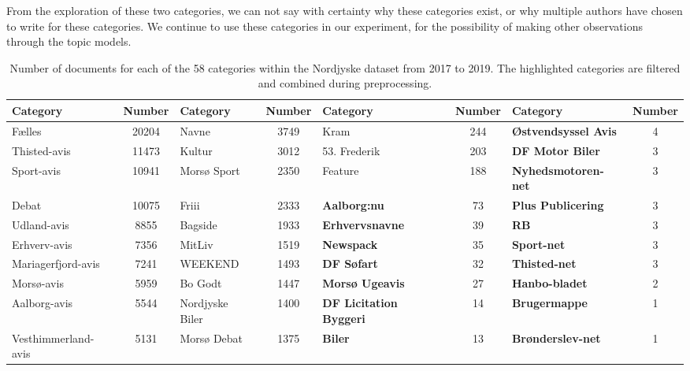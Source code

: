 From the exploration of these two categories, we can not say with certainty why these categories exist, or why multiple authors have chosen to write for these categories.
We continue to use these categories in our experiment, for the possibility of making other observations through the topic models.
\begin{table}[h]
	\caption{Number of documents for each of the 58 categories within the Nordjyske dataset from 2017 to 2019.
		The highlighted categories are filtered and combined during preprocessing.}
	\label{tab:category_table}
	\centering
	\begin{tabular}{l|c|l|c|l|c|l|c}
		Category            & Number & Category        & Number & Category                       & Number & Category                    & Number \\
		\midrule
		Fælles              & 20204  & Navne           &  3749  & Kram                           &  244   & \textbf{Østvendsyssel Avis} &   4    \\
		Thisted-avis        & 11473  & Kultur          &  3012  & 53. Frederik                   &  203   & \textbf{DF Motor Biler}     &   3    \\
		Sport-avis          & 10941  & Morsø Sport     &  2350  & Feature                        &  188   & \textbf{Nyhedsmotoren-net}  &   3    \\
		Debat               & 10075  & Friii           &  2333  & \textbf{Aalborg:nu}            &   73   & \textbf{Plus Publicering}   &   3    \\
		Udland-avis         &  8855  & Bagside         &  1933  & \textbf{Erhvervsnavne}         &   39   & \textbf{RB}                 &   3    \\
		Erhverv-avis        &  7356  & MitLiv          &  1519  & \textbf{Newspack}              &   35   & \textbf{Sport-net}          &   3    \\
		Mariagerfjord-avis  &  7241  & WEEKEND         &  1493  & \textbf{DF Søfart}             &   32   & \textbf{Thisted-net}        &   3    \\
		Morsø-avis          &  5959  & Bo Godt         &  1447  & \textbf{Morsø Ugeavis}         &   27   & \textbf{Hanbo-bladet}       &   2    \\
		Aalborg-avis        &  5544  & Nordjyske Biler &  1400  & \textbf{DF Licitation Byggeri} &   14   & \textbf{Brugermappe}        &   1    \\
		Vesthimmerland-avis &  5131  & Morsø Debat     &  1375  & \textbf{Biler}                 &   13   & \textbf{Brønderslev-net}    &   1    \\

\end{tabular}
\end{table}
